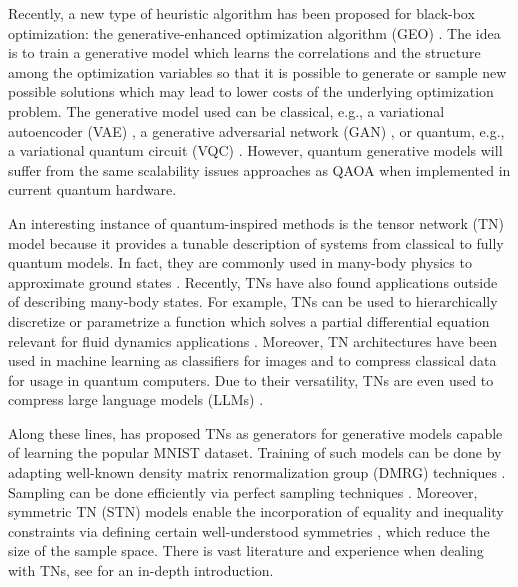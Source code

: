 Recently, a new type of heuristic algorithm has been proposed for black-box optimization: the generative-enhanced optimization algorithm (GEO) \cite{Alcazar2024, batsheva2023}. The idea is to train a generative model which learns the correlations and the structure among the optimization variables so that it is possible to generate or sample new possible solutions which may lead to lower costs of the underlying optimization problem. The generative model used can be classical, e.g., a variational autoencoder (VAE) \cite{cinelli2021variational}, a generative adversarial network (GAN) \cite{goodfellow_generative_2014}, or quantum, e.g., a variational quantum circuit (VQC) \cite{vqa}. However, quantum generative models will suffer from the same scalability issues approaches as QAOA when implemented in current quantum hardware.

An interesting instance of quantum-inspired methods is the tensor network (TN) model because it provides a tunable description of systems from classical to fully quantum models. In fact, they are commonly used in many-body physics to approximate ground states \cite{Orús2019}. Recently, TNs have also found applications outside of describing many-body states. For example, TNs can be used to hierarchically discretize or parametrize a function which solves a partial differential equation relevant for fluid dynamics applications \cite{Gourianov2022}. Moreover, TN architectures have been used in machine learning as classifiers for images \cite{Guala2023} and to compress classical data \cite{jobst2023efficient} for usage in quantum computers. Due to their versatility, TNs are even used to compress large language models (LLMs) \cite{tomut2024compactifai}. 

Along these lines, \cite{PhysRevX.8.031012} has proposed TNs as generators for generative models capable of learning the popular MNIST dataset. Training of such models can be done by adapting well-known density matrix renormalization group (DMRG) techniques \cite{RevModPhys.77.259}. Sampling can be done efficiently via perfect sampling techniques \cite{PhysRevB.85.165146}. Moreover, symmetric TN (STN) models enable the incorporation of equality \cite{lopezpiqueres2023symmetric} and inequality \cite{lopezpiqueres2024constrainingtensornetworks} constraints via defining certain well-understood symmetries \cite{PhysRevB.83.115125}, which reduce the size of the sample space. There is vast literature and experience when dealing with TNs, see \cite{ORUS2014117} for an in-depth introduction. 

